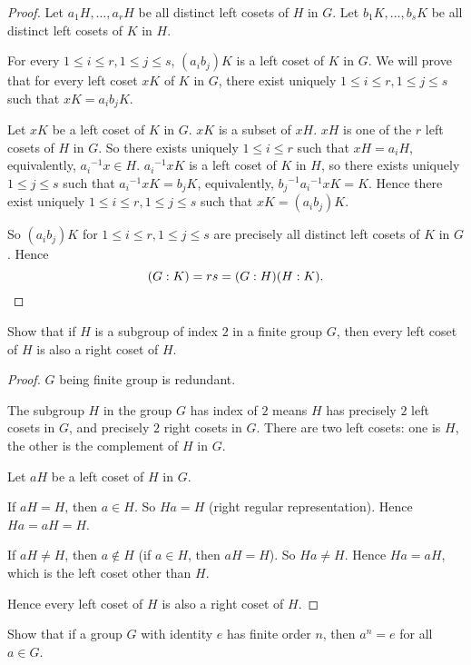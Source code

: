 \begin{proof}
    Let $a_{1}H, \ldots, a_{r}H$ be all distinct left cosets of $H$ in $G$. Let $b_{1}K, \ldots, b_{s}K$ be all distinct left cosets of $K$ in $H$.

    For every $1\leq i\leq r, 1\leq j\leq s$, $(a_{i}b_{j})K$ is a left coset of $K$ in $G$. We will prove that for every left coset $xK$ of $K$ in $G$, there exist uniquely $1\leq i\leq r, 1\leq j\leq s$ such that $xK = a_{i}b_{j}K$.

    Let $xK$ be a left coset of $K$ in $G$. $xK$ is a subset of $xH$. $xH$ is one of the $r$ left cosets of $H$ in $G$. So there exists uniquely $1\leq i\leq r$ such that $xH = a_{i}H$, equivalently, ${a_{i}}^{-1}x\in H$. ${a_{i}}^{-1}xK$ is a left coset of $K$ in $H$, so there exists uniquely $1\leq j\leq s$ such that ${a_{i}}^{-1}xK = b_{j}K$, equivalently, ${b_{j}}^{-1}{a_{i}}^{-1}xK = K$. Hence there exist uniquely $1\leq i\leq r, 1\leq j\leq s$ such that $xK = (a_{i}b_{j})K$.

    So $(a_{i}b_{j})K$ for $1\leq i\leq r, 1\leq j\leq s$ are precisely all distinct left cosets of $K$ in $G$. Hence
    \[
        (G:K) = rs = (G:H)(H:K).\qedhere
    \]
\end{proof}

\newpage
\begin{exercise}
    Show that if $H$ is a subgroup of index $2$ in a finite group $G$, then every left coset of $H$ is also a right coset of $H$.
\end{exercise}

\begin{proof}
    $G$ being finite group is redundant.

    The subgroup $H$ in the group $G$ has index of $2$ means $H$ has precisely $2$ left cosets in $G$, and precisely $2$ right cosets in $G$. There are two left cosets: one is $H$, the other is the complement of $H$ in $G$.

    Let $aH$ be a left coset of $H$ in $G$.

    If $aH = H$, then $a\in H$. So $Ha = H$ (right regular representation). Hence $Ha = aH = H$.

    If $aH\ne H$, then $a\notin H$ (if $a\in H$, then $aH = H$). So $Ha\ne H$. Hence $Ha = aH$, which is the left coset other than $H$.

    Hence every left coset of $H$ is also a right coset of $H$.
\end{proof}

\newpage
\begin{exercise}
    Show that if a group $G$ with identity $e$ has finite order $n$, then $a^{n} = e$ for all $a\in G$.
\end{exercise}

